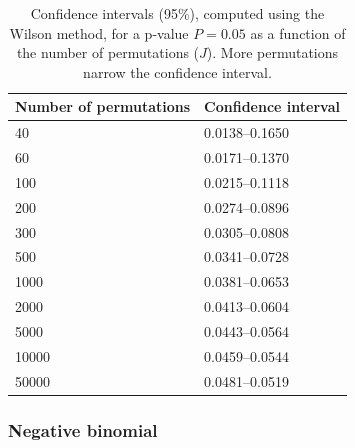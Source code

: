 \begin{table}[!tp]
\caption[Confidence intervals as a function of the number of permutations.]{Confidence intervals (95\%), computed using the Wilson method, for a p-value $P=0.05$ as a function of the number of permutations ($J$). More permutations narrow the confidence interval.}
\begin{center}
\begin{tabular}{@{}m{25mm}<{\raggedright}m{25mm}<{\raggedright}@{}}
\toprule
Number of permutations & Confidence interval\\
\midrule
40 & 0.0138--0.1650\\
60 & 0.0171--0.1370\\
100 & 0.0215--0.1118\\
200 & 0.0274--0.0896\\
300 & 0.0305--0.0808\\
500 & 0.0341--0.0728\\
1000 & 0.0381--0.0653\\
2000 & 0.0413--0.0604\\
5000 & 0.0443--0.0564\\
10000 & 0.0459--0.0544\\
50000 & 0.0481--0.0519\\
\bottomrule
\end{tabular}
\end{center}
\label{tab:fewpermCI}
\end{table}

\subsubsection{Negative binomial}

